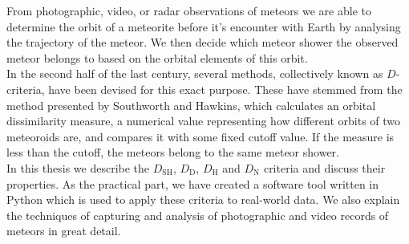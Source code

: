 {\small
From photographic, video, or radar observations of meteors we are able to determine the orbit of a meteorite before it's encounter with Earth by analysing the trajectory of the meteor. We then decide which meteor shower the observed meteor belongs to based on the orbital elements of this orbit.\\
In the second half of the last century, several methods, collectively known as $D$-criteria, have been devised for this exact purpose. These have stemmed from the method presented by Southworth and Hawkins, which calculates an orbital dissimilarity measure, a numerical value representing how different orbits of two meteoroids are, and compares it with some fixed cutoff value. If the measure is less than the cutoff, the meteors belong to the same meteor shower.\\
In this thesis we describe the $D_\text{SH}$, $D_\text{D}$, $D_\text{H}$ and $D_\text{N}$ criteria and discuss their properties. As the practical part, we have created a software tool written in Python which is used to apply these criteria to real-world data. We also explain the techniques of capturing and analysis of photographic and video records of meteors in great detail.
}